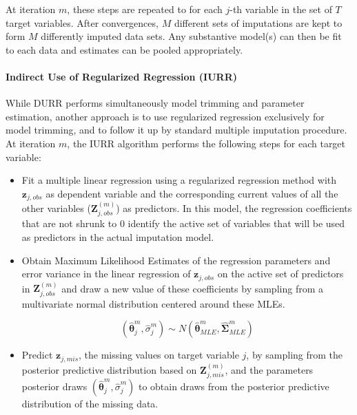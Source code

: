 	At iteration $m$, these steps are repeated to for each $j$-th variable in the set of $T$ target 
	variables. After convergences, $M$ different sets of imputations are kept to form 
	$M$ differently imputed data sets. Any substantive model(s) can then be fit to each data and 
	estimates can be pooled appropriately.

\paragraph{Indirect Use of Regularized Regression (IURR)}
	While DURR performs simultaneously model trimming and parameter estimation, another approach is to
	use regularized regression exclusively for model trimming, and to follow it up by standard multiple 
	imputation procedure. At iteration $m$, the IURR algorithm performs the following steps for each
	target variable:

	\begin{itemize}

	\item Fit a multiple linear regression using a regularized regression method with $\bm{z}_{j,obs}$ as dependent 
	 	variable and the corresponding current values of all the other variables ($\bm{Z}_{j,obs}^{(m)}$) as 
		predictors. In this model, the regression coefficients that are not shrunk to 0 identify the active 
		set of variables that will be used as predictors in the actual imputation model.
	
	\item Obtain Maximum Likelihood Estimates of the regression parameters and error variance in the linear
		regression of $\bm{z}_{j,obs}$ on the active set of predictors in $\bm{Z}_{j,obs}^{(m)}$ and
		draw a new value of these coefficients by sampling from a multivariate normal distribution
		centered around these MLEs.

		\begin{equation}
		(\hat{\bm{\theta}}_{j}^{m}, \hat{\sigma}_{j}^{m}) \sim N(\hat{\bm{\theta}}_{MLE}^{m}, \hat{\bm{\Sigma}}_{MLE}^{m})
		\end{equation}

	\item Predict $\bm{z}_{j,mis}$, the missing values on target variable $j$, by sampling from the 
		posterior predictive distribution based on $\bm{Z}_{j,mis}^{(m)}$,
		and the parameters posterior draws $(\hat{\bm{\theta}}_{j}^{m}, \hat{\sigma}_{j}^{m})$
		to obtain draws from the posterior predictive distribution of the missing data.

	\end{itemize}

